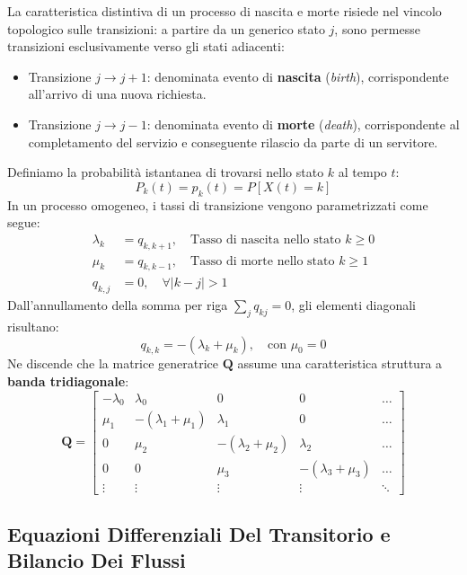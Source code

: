 \documentclass[11pt, a4paper]{article}
\begin{document}
La caratteristica distintiva di un processo di nascita e morte risiede nel vincolo topologico sulle transizioni: a partire da un generico stato $j$, sono permesse transizioni esclusivamente verso gli stati adiacenti:
\begin{itemize}
    \item Transizione $j \to j+1$: denominata evento di \textbf{nascita} (\emph{birth}), corrispondente all'arrivo di una nuova richiesta.
    \item Transizione $j \to j-1$: denominata evento di \textbf{morte} (\emph{death}), corrispondente al completamento del servizio e conseguente rilascio da parte di un servitore.
\end{itemize}

Definiamo la probabilità istantanea di trovarsi nello stato $k$ al tempo $t$:
\[
    P_k(t) = p_k(t) = P[X(t) = k]
\]
In un processo omogeneo, i tassi di transizione vengono parametrizzati come segue:
\begin{align*}
    \lambda_k &= q_{k, k+1}, \quad \text{Tasso di nascita nello stato } k \ge 0 \\
    \mu_k &= q_{k, k-1}, \quad \text{Tasso di morte nello stato } k \ge 1 \\
    q_{k,j} &= 0, \quad \forall |k - j| > 1
\end{align*}
Dall'annullamento della somma per riga $\sum_j q_{kj} = 0$, gli elementi diagonali risultano:
\[
    q_{k,k} = -(\lambda_k + \mu_k), \quad \text{con } \mu_0 = 0
\]
Ne discende che la matrice generatrice $\bm{Q}$ assume una caratteristica struttura a \textbf{banda tridiagonale}:
\[
    \bm{Q} = \begin{bmatrix}
        -\lambda_0 & \lambda_0 & 0 & 0 & \dots \\
        \mu_1 & -(\lambda_1 + \mu_1) & \lambda_1 & 0 & \dots \\
        0 & \mu_2 & -(\lambda_2 + \mu_2) & \lambda_2 & \dots \\
        0 & 0 & \mu_3 & -(\lambda_3 + \mu_3) & \dots \\
        \vdots & \vdots & \vdots & \vdots & \ddots
    \end{bmatrix}
\]

\subsection{Equazioni Differenziali Del Transitorio e Bilancio Dei Flussi}
\end{document}
